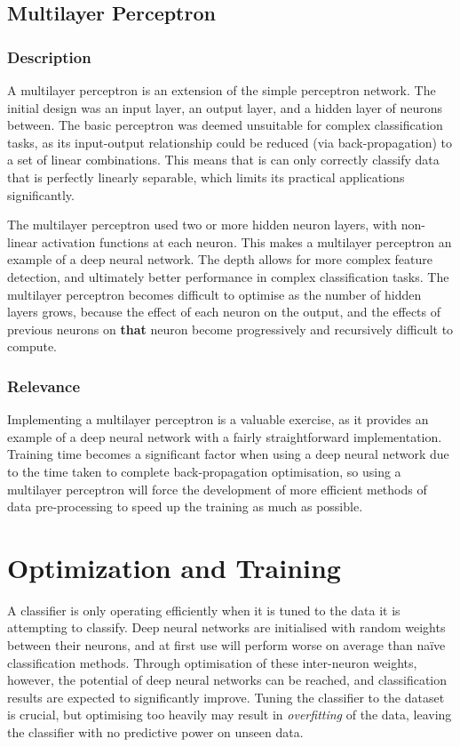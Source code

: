 \subsection{Multilayer Perceptron}
\subsubsection{Description}
A multilayer perceptron is an extension of the simple perceptron network. The initial design was an input layer, an output layer, and a hidden layer of neurons between. The basic perceptron was deemed unsuitable for complex classification tasks, as its input-output relationship could be reduced (via back-propagation) to a set of linear combinations. This means that is can only correctly classify data that is perfectly linearly separable, which limits its practical applications significantly.

The multilayer perceptron used two or more hidden neuron layers, with non-linear activation functions at each neuron. This makes a multilayer perceptron an example of a deep neural network. The depth allows for more complex feature detection, and ultimately better performance in complex classification tasks. The multilayer perceptron becomes difficult to optimise as the number of hidden layers grows, because the effect of each neuron on the output, and the effects of previous neurons on \textbf{that} neuron become progressively and recursively difficult to compute.
\subsubsection{Relevance}
Implementing a multilayer perceptron is a valuable exercise, as it provides an example of a deep neural network with a fairly straightforward implementation. Training time becomes a significant factor when using a deep neural network due to the time taken to complete back-propagation optimisation, so using a multilayer perceptron will force the development of more efficient methods of data pre-processing to speed up the training as much as possible.

\section{Optimization and Training}
A classifier is only operating efficiently when it is tuned to the data it is attempting to classify. Deep neural networks are initialised with random weights between their neurons, and at first use will perform worse on average than na{\"ive} classification methods. Through optimisation of these inter-neuron weights, however, the potential of deep neural networks can be reached, and classification results are expected to significantly improve. Tuning the classifier to the dataset is crucial, but optimising too heavily may result in \textit{overfitting} of the data, leaving the classifier with no predictive power on unseen data.

